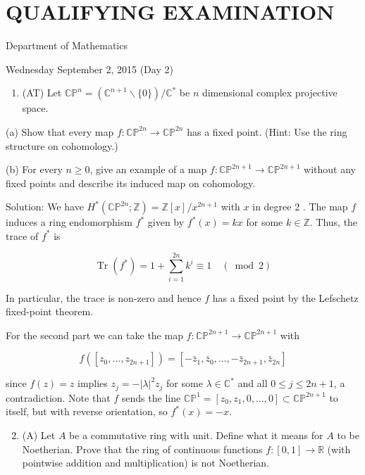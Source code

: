 \documentclass[10pt]{article}
\begin{document}
\section*{QUALIFYING EXAMINATION }
Department of Mathematics

Wednesday September 2, 2015 (Day 2)

\begin{enumerate}
  \item (AT) Let $\mathbb{C P}^{n}=\left(\mathbb{C}^{n+1} \backslash\{0\}\right) / \mathbb{C}^{*}$ be $n$ dimensional complex projective space.
\end{enumerate}

(a) Show that every map $f: \mathbb{C P}^{2 n} \rightarrow \mathbb{C P}^{2 n}$ has a fixed point. (Hint: Use the ring structure on cohomology.)

(b) For every $n \geq 0$, give an example of a map $f: \mathbb{C P}^{2 n+1} \rightarrow \mathbb{C P}^{2 n+1}$ without any fixed points and describe its induced map on cohomology.

Solution: We have $H^{*}\left(\mathbb{C P}^{2 n} ; \mathbb{Z}\right)=\mathbb{Z}[x] / x^{2 n+1}$ with $x$ in degree 2 . The map $f$ induces a ring endomorphism $f^{*}$ given by $f^{*}(x)=k x$ for some $k \in \mathbb{Z}$. Thus, the trace of $f^{*}$ is

$$
\operatorname{Tr}\left(f^{*}\right)=1+\sum_{i=1}^{2 n} k^{i} \equiv 1 \quad(\bmod 2)
$$

In particular, the trace is non-zero and hence $f$ has a fixed point by the Lefschetz fixed-point theorem.

For the second part we can take the map $f: \mathbb{C P}^{2 n+1} \rightarrow \mathbb{C P}^{2 n+1}$ with

$$
f\left(\left[z_{0}, \ldots, z_{2 n+1}\right]\right)=\left[-\bar{z}_{1}, \bar{z}_{0}, \ldots,-\bar{z}_{2 n+1}, \bar{z}_{2 n}\right]
$$

since $f(z)=z$ implies $z_{j}=-|\lambda|^{2} z_{j}$ for some $\lambda \in \mathbb{C}^{*}$ and all $0 \leq j \leq 2 n+1$, a contradiction. Note that $f$ sends the line $\mathbb{C P}^{1}=\left[z_{0}, z_{1}, 0, \ldots, 0\right] \subset \mathbb{C P}^{2 n+1}$ to itself, but with reverse orientation, so $f^{*}(x)=-x$.

\begin{enumerate}
  \setcounter{enumi}{1}
  \item (A) Let $A$ be a commutative ring with unit. Define what it means for $A$ to be Noetherian. Prove that the ring of continuous functions $f:[0,1] \rightarrow \mathbb{R}$ (with pointwise addition and multiplication) is not Noetherian.
\end{enumerate}
\end{document}
